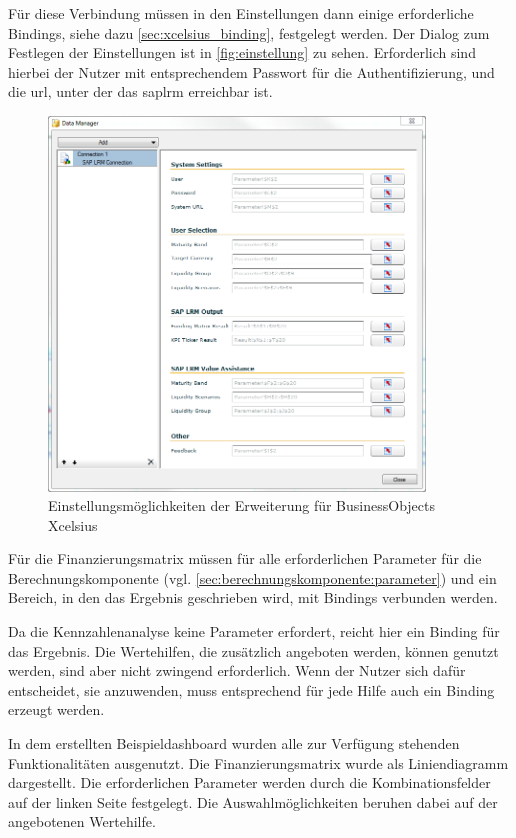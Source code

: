 \begin{onehalfspacing}
Für diese Verbindung müssen in den Einstellungen dann einige erforderliche Bindings, siehe dazu \vref{sec:xcelsius_binding}, festgelegt werden. Der Dialog zum Festlegen der Einstellungen ist in \vref{fig:einstellung} zu sehen. Erforderlich sind hierbei der Nutzer mit entsprechendem Passwort für die Authentifizierung, und die \gls{url}, unter der das \gls{saplrm} erreichbar ist.

\begin{figure}[ht]
\centering
\setlength{\unitlength}{1mm}
\includegraphics[width=10cm]{images/xcelsius_einstellungen.PNG}
\caption{Einstellungsmöglichkeiten der Erweiterung für BusinessObjects Xcelsius\label{fig:einstellung}}
\end{figure} 

Für die Finanzierungsmatrix müssen für alle erforderlichen Parameter für die Berechnungskomponente (vgl. \vref{sec:berechnungskomponente:parameter}) und ein Bereich, in den das Ergebnis geschrieben wird, mit Bindings verbunden werden.

Da die Kennzahlenanalyse keine Parameter erfordert, reicht hier ein Binding für das Ergebnis. Die Wertehilfen, die zusätzlich angeboten werden, können genutzt werden, sind aber nicht zwingend erforderlich. Wenn der Nutzer sich dafür entscheidet, sie anzuwenden, muss entsprechend für jede Hilfe auch ein Binding erzeugt werden.

In dem erstellten Beispieldashboard wurden alle zur Verfügung stehenden Funktionalitäten ausgenutzt. Die Finanzierungsmatrix wurde als Liniendiagramm dargestellt. Die erforderlichen Parameter werden durch die Kombinationsfelder auf der linken Seite festgelegt. Die Auswahlmöglichkeiten beruhen dabei auf der angebotenen Wertehilfe. 


\end{onehalfspacing}
